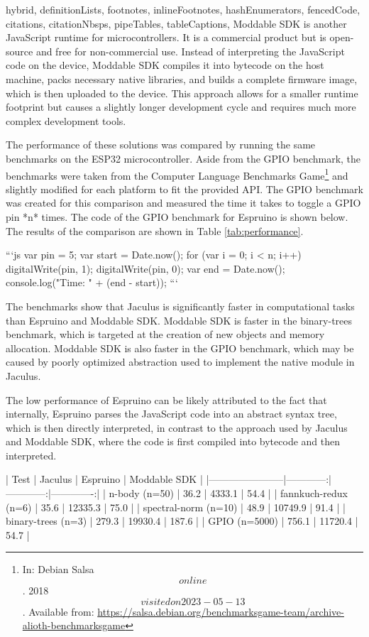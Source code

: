 \begin{markdown*}{%
  hybrid,
  definitionLists,
  footnotes,
  inlineFootnotes,
  hashEnumerators,
  fencedCode,
  citations,
  citationNbsps,
  pipeTables,
  tableCaptions,
}
Moddable SDK is another JavaScript runtime for microcontrollers. It is a commercial product but is open-source and free for non-commercial use. Instead of interpreting the JavaScript code on the device, Moddable SDK compiles it into bytecode on the host machine, packs necessary native libraries, and builds a complete firmware image, which is then uploaded to the device. This approach allows for a smaller runtime footprint but causes a slightly longer development cycle and requires much more complex development tools.

The performance of these solutions was compared by running the same benchmarks on the ESP32 microcontroller. Aside from the GPIO benchmark, the benchmarks were taken from the Computer Language Benchmarks Game\footnote{In: Debian Salsa \[online\]. 2018 \[visited on 2023-05-13\]. Available from: \url{https://salsa.debian.org/benchmarksgame-team/archive-alioth-benchmarksgame}} and slightly modified for each platform to fit the provided API. The GPIO benchmark was created for this comparison and measured the time it takes to toggle a GPIO pin *n* times. The code of the GPIO benchmark for Espruino is shown below. The results of the comparison are shown in Table \ref{tab:performance}.

```js
var pin = 5;
var start = Date.now();
for (var i = 0; i < n; i++) {
  digitalWrite(pin, 1);
  digitalWrite(pin, 0);
}
var end = Date.now();
console.log("Time: " + (end - start));
```

The benchmarks show that Jaculus is significantly faster in computational tasks than Espruino and Moddable SDK. Moddable SDK is faster in the binary-trees benchmark, which is targeted at the creation of new objects and memory allocation. Moddable SDK is also faster in the GPIO benchmark, which may be caused by poorly optimized abstraction used to implement the native module in Jaculus.

The low performance of Espruino can be likely attributed to the fact that internally, Espruino parses the JavaScript code into an abstract syntax tree, which is then directly interpreted, in contrast to the approach used by Jaculus and Moddable SDK, where the code is first compiled into bytecode and then interpreted.


\begin{table}[ht]
  \centering

  | Test                  | Jaculus     | Espruino    | Moddable SDK |
  |-----------------------|------------:|------------:|-------------:|
  | n-body (n=50)         | 36.2        | 4333.1      | 54.4         |
  | fannkuch-redux (n=6)  | 35.6        | 12335.3     | 75.0         |
  | spectral-norm (n=10)  | 48.9        | 10749.9     | 91.4         |
  | binary-trees (n=3)    | 279.3       | 19930.4     | 187.6        |
  | GPIO (n=5000)         | 756.1       | 11720.4     | 54.7         |


\end{table}
\end{markdown*}
